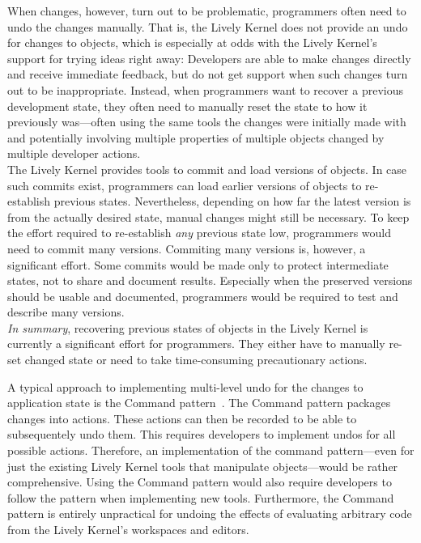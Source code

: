 When changes, however, turn out to be problematic, programmers often need to undo the changes manually.
That is, the Lively Kernel does not provide an undo for changes to objects, which is especially at odds with the Lively Kernel's support for trying ideas right away: Developers are able to make changes directly and receive immediate feedback, but do not get support when such changes turn out to be inappropriate.
Instead, when programmers want to recover a previous development state, they often need to manually reset the state to how it previously was---often using the same tools the changes were initially made with and potentially involving multiple properties of multiple objects changed by multiple developer actions.\\
The Lively Kernel provides tools to commit and load versions of objects.
In case such commits exist, programmers can load earlier versions of objects to re-establish previous states.
Nevertheless, depending on how far the latest version is from the actually desired state, manual changes might still be necessary.
To keep the effort required to re-establish \emph{any} previous state low, programmers would need to commit many versions.
Commiting many versions is, however, a significant effort.
Some commits would be made only to protect intermediate states, not to share and document results.
Especially when the preserved versions should be usable and documented, programmers would be required to test and describe many versions.\\
\emph{In summary}, recovering previous states of objects in the Lively Kernel is currently a significant effort for programmers.
They either have to manually re-set changed state or need to take time-consuming precautionary actions.

A typical approach to implementing multi-level undo for the changes to application state is the Command pattern~\cite{GammaHelmJohnsonVlissides95}.
The Command pattern packages changes into actions.
These actions can then be recorded to be able to subsequentely undo them.
This requires developers to implement undos for all possible actions.
Therefore, an implementation of the command pattern---even for just the existing Lively Kernel tools that manipulate objects---would be rather comprehensive.
Using the Command pattern would also require developers to follow the pattern when implementing new tools.
Furthermore, the Command pattern is entirely unpractical for undoing the effects of evaluating arbitrary code from the Lively Kernel's workspaces and editors.

